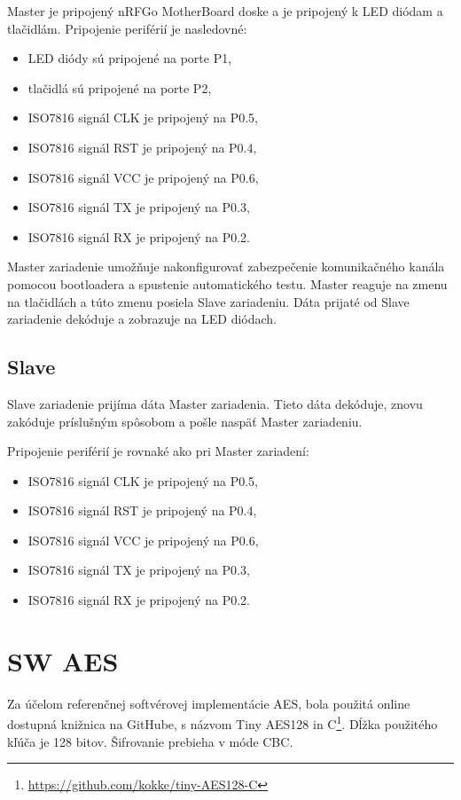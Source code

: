 \documentclass[12pt,a4wide,oneside,openright]{report}
\begin{document}
	Master je pripojený nRFGo MotherBoard doske a je pripojený k LED diódam a tlačidlám. 
	Pripojenie periférií je nasledovné:
	\singlespacing
	\begin{itemize}
		\item LED diódy sú pripojené na porte P1,
		\item tlačidlá sú pripojené na porte P2,
		\item ISO7816 signál CLK je pripojený na P0.5,
		\item ISO7816 signál RST je pripojený na P0.4,
		\item ISO7816 signál VCC je pripojený na P0.6,
		\item ISO7816 signál TX je pripojený na P0.3,
		\item ISO7816 signál RX je pripojený na P0.2.
	\end{itemize}
	\onehalfspacing

	Master zariadenie umožňuje nakonfigurovať zabezpečenie komunikačného kanála pomocou bootloadera a spustenie automatického testu. 
	Master reaguje na zmenu na tlačidlách a túto zmenu posiela Slave zariadeniu. 
	Dáta prijaté od Slave zariadenie dekóduje a zobrazuje na LED diódach.

\subsection{Slave}
	Slave zariadenie prijíma dáta Master zariadenia. Tieto dáta dekóduje, znovu zakóduje príslušným spôsobom a pošle naspäť Master zariadeniu.
	
	\singlespacing
	Pripojenie periférií je rovnaké ako pri Master zariadení:
	\begin{itemize}
		\item ISO7816 signál CLK je pripojený na P0.5,
		\item ISO7816 signál RST je pripojený na P0.4,
		\item ISO7816 signál VCC je pripojený na P0.6,
		\item ISO7816 signál TX je pripojený na P0.3,
		\item ISO7816 signál RX je pripojený na P0.2.
	\end{itemize}
	\onehalfspacing

\section{SW AES}
Za účelom referenčnej softvérovej implementácie AES, bola použitá online dostupná knižnica na GitHube, s názvom Tiny AES128 in C\footnote{\url{https://github.com/kokke/tiny-AES128-C}}. Dĺžka použitého kľúča je 128 bitov. Šifrovanie prebieha v móde CBC.
\end{document}

